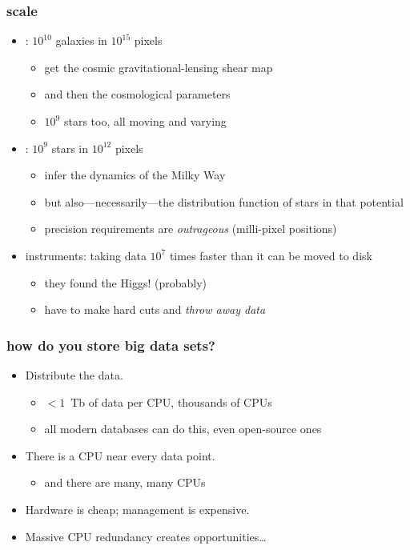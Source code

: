 \documentclass[pdftex]{beamer}
\begin{document}
\begin{frame}
  \frametitle{scale}
  \begin{itemize}
  \item {}: $10^{10}$ galaxies in $10^{15}$ pixels
    \begin{itemize}
    \item get the cosmic gravitational-lensing shear map
    \item and then the cosmological parameters
    \item $10^9$ stars too, all moving and varying
    \end{itemize}
  \item {}: $10^{9}$ stars in $10^{12}$ pixels
    \begin{itemize}
    \item infer the dynamics of the Milky Way
    \item but also---necessarily---the distribution function of stars
      in that potential
    \item precision requirements are \emph{outrageous} (milli-pixel positions)
    \end{itemize}
  \item {} instruments: taking data $10^7$ times faster than it can be moved to disk
    \begin{itemize}
    \item they found the Higgs! (probably)
    \item have to make hard cuts and \emph{throw away data}
    \end{itemize}
  \end{itemize}
\end{frame}

\begin{frame}
  \frametitle{how do you store big data sets?}
  \begin{itemize}
  \item Distribute the data.
    \begin{itemize}
    \item $< 1$~Tb of data per CPU, thousands of CPUs
    \item all modern databases can do this, even open-source ones
    \end{itemize}
  \item There is a CPU near every data point.
    \begin{itemize}
    \item and there are many, many CPUs
    \end{itemize}
  \item Hardware is cheap; management is expensive.
  \item Massive CPU redundancy creates opportunities\ldots
  \end{itemize}
\end{frame}
\end{document}
